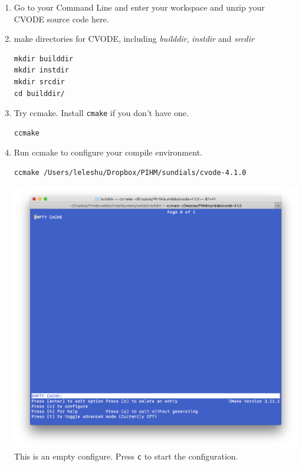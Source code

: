 \documentclass[]{scrbook}
\begin{document}
\begin{enumerate}
\def\labelenumi{\arabic{enumi}.}
\item
  Go to your Command Line and enter your workspace and unzip your CVODE
  source code here.
\item
  make directories for CVODE, including \emph{builddir}, \emph{instdir}
  and \emph{srcdir}

\begin{verbatim}
mkdir builddir
mkdir instdir
mkdir srcdir
cd builddir/
\end{verbatim}
\item
  Try ccmake. Install \texttt{cmake} if you don't have one.

\begin{verbatim}
ccmake 
\end{verbatim}
\item
  Run ccmake to configure your compile environment.

\begin{verbatim}
ccmake /Users/leleshu/Dropbox/PIHM/sundials/cvode-4.1.0
\end{verbatim}

  \includegraphics{Fig/ccmake/1.png} This is an empty configure. Press
  \texttt{c} to start the configuration.
\end{enumerate}
\end{document}
